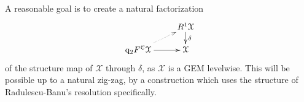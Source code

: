 \documentclass[11pt]{amsart} \renewcommand{\baselinestretch}{1.2}
\theoremstyle{plain}
\numberwithin{equation}{section} %
\theoremstyle{plain}
\numberwithin{equation}{chapter} %
\renewcommand{\to}{\longrightarrow}
\newcommand{\from}{\longleftarrow}
\newcommand{\frakt}{\mathfrak{t}}
\newcommand{\fraks}{\mathfrak{s}}
\newcommand{\calx}{\mathcal{X}}
\newcommand{\calc}{\mathcal{C}}
\newcommand{\quadgrad}[1]{\mathrm{q}_{#1}}
\newcommand{\Dendo}{R}
\begin{document}
\begin{Operations on the Bousfield-Kan spectral sequence}
A reasonable goal is to create a natural factorization
\[\xymatrix@R=4mm{
&%
\Dendo^1\calx\ar[d]^-{\delta}
\\%
\quadgrad{2}F^{\calc}\calx\ar@{..>}[ur]
\ar[r]
&%
\calx%
}\]
of the structure map of $\calx$ through $\delta$, as $\calx$ is a GEM levelwise. This will be possible up to a natural zig-zag, by a  construction which uses the structure of Radulescu-Banu's resolution specifically. 
%
%
%
%





\end{Operations on the Bousfield-Kan spectral sequence}
\end{document}
